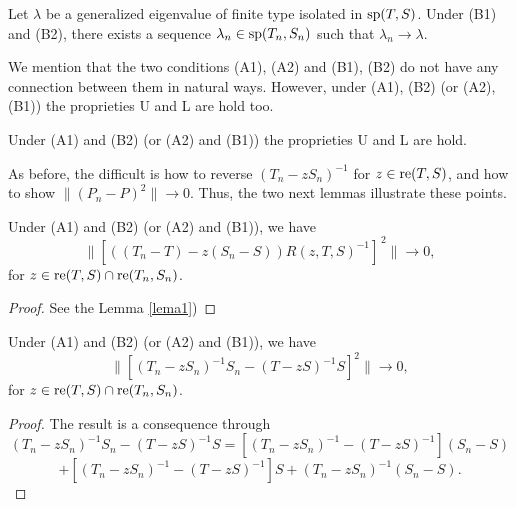 \documentclass[
11pt,%
tightenlines,%
twoside,%
onecolumn,%
nofloats,%
nobibnotes,%
nofootinbib,%
superscriptaddress,%
noshowpacs,%
centertags]%
{revtex4}
\def\re{\mathop{\rm re}\nolimits}
\def\sp{\mathop{\rm sp}\nolimits}
\def\re{\mathop{\rm re}\nolimits}
\begin{document}
\begin{corollary}
Let $\lambda$ be a generalized eigenvalue of finite type isolated in
$\sp(T,S)$. Under (B1) and (B2), there exists a sequence
$\lambda_n\in\sp(T_n,S_n)$ such that $\lambda_n\rightarrow\lambda$.
\end{corollary}
\par
We mention that the two conditions (A1), (A2) and (B1), (B2) do not
have any connection between them in natural ways. However, under
(A1), (B2) (or (A2), (B1)) the proprieties U and L are hold too.
\begin{theorem}
Under (A1) and (B2) (or (A2) and (B1)) the proprieties U and L are hold.
\end{theorem}
As before, the difficult is how to reverse $(T_n-zS_n)^{-1}$ for
$z\in\re(T,S)$, and how to show $\|(P_n-P)^{2}\|\rightarrow0$. Thus,
the two next lemmas illustrate these points.
\begin{lemma}
Under (A1) and (B2) (or (A2) and (B1)), we have
\begin{equation*}
    \|[((T_n-T)-z(S_n-S))R(z,T,S)^{-1}]^{\,2}\|\rightarrow0,
\end{equation*}
for $z\in\re(T,S)\cap\re(T_n,S_n)$.
\end{lemma}
\begin{proof} See the Lemma \ref{lema1})
\end{proof}
\begin{lemma}
Under (A1) and (B2) (or (A2) and (B1)), we have
\begin{equation*}
     \|[(T_n-zS_n)^{-1}S_n-(T-zS)^{-1}S]^{2}\|\rightarrow0,
\end{equation*}
for $z\in\mbox{re}(T,S)\cap\re(T_n,S_n)$.
\end{lemma}
\begin{proof} The result is a consequence through
$$
  (T_n-zS_n)^{-1}S_n-(T-zS)^{-1}S = [(T_n-zS_n)^{-1}-(T-zS)^{-1}](S_n-S)
  $$
  $$
  +[(T_n-zS_n)^{-1}-(T-zS)^{-1}]S + (T_n-zS_n)^{-1}(S_n-S).
$$
\end{proof}
\end{document}
